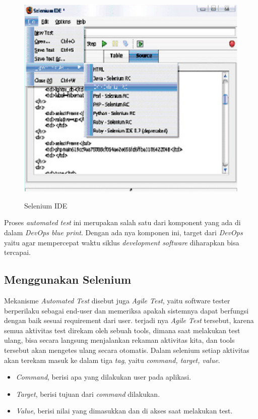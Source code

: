 \documentclass[9pt,twocolumn,twoside]{Gunadarma}
\begin{document}
\begin{figure}[htbp]
	\begin{center}
		\includegraphics[width=1\columnwidth]{selenium.eps} \label{fig:1-noFCase1}
	\end{center}
	\caption{Selenium IDE}
\end{figure}


Proses \textit{automated test} ini merupakan salah satu dari komponent yang ada di dalam \textit{DevOps blue print}.  Dengan ada nya komponen ini, target dari \textit{DevOps} yaitu agar mempercepat waktu siklus \textit{development software}  diharapkan bisa tercapai. 

\subsection{Menggunakan Selenium}
Mekanisme \textit{Automated Test} disebut juga \textit{Agile Test}, yaitu software tester berperilaku sebagai end-user dan memeriksa apakah sistemnya dapat berfungsi dengan baik sesuai requirement dari user. 
terjadi nya \textit{Agile Test} tersebut, karena semua aktivitas test direkam oleh sebuah tools, dimana saat melakukan test ulang, bisa secara langsung menjalankan rekaman aktivitas kita, dan tools tersebut akan mengetes ulang secara otomatis. Dalam selenium setiap aktivitas akan terekam masuk ke dalam tiga \textit{tag}, yaitu \textit{command, target, value}. 

\begin{itemize}
	\item \textit{Command}, berisi apa yang dilakukan user pada aplikasi.
	\item \textit{Target}, berisi tujuan dari \textit{command} dilakukan.
	\item \textit{Value}, berisi nilai yang dimasukkan dan di akses saat melakukan test. 
\end{itemize}
\end{document}
